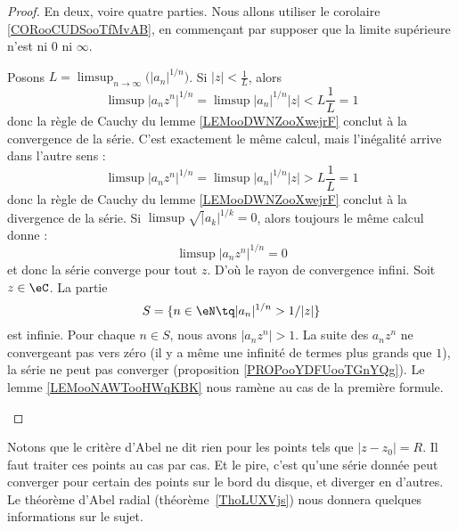 \begin{proof}
	En deux, voire quatre parties. Nous allons utiliser le corolaire \ref{CORooCUDSooTfMvAB}, en commençant par supposer que la limite supérieure n'est ni \( 0\) ni \( \infty\).
	\begin{subproof}
		Posons \( L=\limsup_{n\to \infty}\big( | a_n |^{1/n} \big)\). Si \( | z |<\frac{1}{ L }\), alors
		\begin{equation}
			\limsup| a_nz^n |^{1/n}= \limsup| a_n |^{1/n}| z |
			<L\frac{1}{ L }
			=1
		\end{equation}
		donc la règle de Cauchy du lemme \ref{LEMooDWNZooXwejrF} conclut à la convergence de la série.
		C'est exactement le même calcul, mais l'inégalité arrive dans l'autre sens :
		\begin{equation}
			\limsup| a_nz^n |^{1/n}= \limsup| a_n |^{1/n}| z |
			>L\frac{1}{ L }
			=1
		\end{equation}
		donc la règle de Cauchy du lemme \ref{LEMooDWNZooXwejrF} conclut à la divergence de la série.
		Si \( \limsup\sqrt| a_k |^{1/k}=0\), alors toujours le même calcul donne :
		\begin{equation}
			\limsup| a_nz^n |^{1/n}=0
		\end{equation}
		et donc la série converge pour tout \( z\). D'où le rayon de convergence infini.
		Soit \( z\in \eC\). La partie
		\begin{equation}
			S=\{ n\in \eN\tq | a_n |^{1/n}>1/| z | \}
		\end{equation}
		est infinie. Pour chaque \( n\in S\), nous avons \( | a_n z^n |>1\). La suite des \( a_nz^n\) ne convergeant pas vers zéro (il y a même une infinité de termes plus grands que \( 1\)), la série ne peut pas converger (proposition \ref{PROPooYDFUooTGnYQg}).
		Le lemme \ref{LEMooNAWTooHWqKBK} nous ramène au cas de la première formule.
	\end{subproof}
\end{proof}

Notons que le critère d'Abel ne dit rien pour les points tels que \( | z-z_0 |=R\). Il faut traiter ces points au cas par cas. Et le pire, c'est qu'une série donnée peut converger pour certain des points sur le bord du disque, et diverger en d'autres. Le théorème d'Abel radial (théorème~\ref{ThoLUXVjs}) nous donnera quelques informations sur le sujet.

